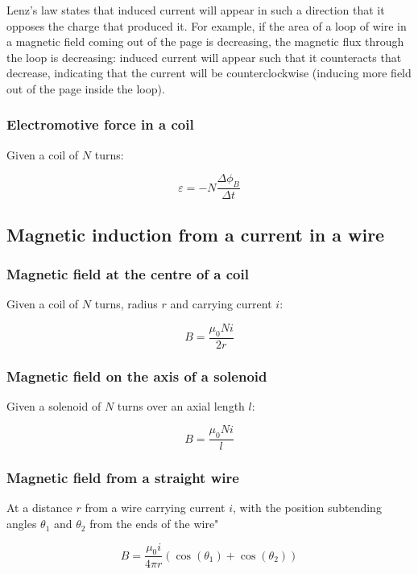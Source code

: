 \documentclass[12pt]{article}
\begin{document}
Lenz's law states that induced current will appear in such a direction that it opposes the charge that produced it.
For example, if the area of a loop of wire in a magnetic field coming out of the page is decreasing, the magnetic flux through the loop is decreasing: induced current will appear such that it counteracts that decrease, indicating that the current will be counterclockwise (inducing more field out of the page inside the loop).

\subsubsection{Electromotive force in a coil}

Given a coil of $N$ turns:

\[
\boxed{
\varepsilon=-N\frac{\Delta \phi_B}{\Delta t}
}
\]

\newpage

\subsection{Magnetic induction from a current in a wire}

\subsubsection{Magnetic field at the centre of a coil}

Given a coil of $N$ turns, radius $r$ and carrying current $i$:

\[
\boxed{
B=\frac{\mu_0 Ni}{2r}
}
\]

\subsubsection{Magnetic field on the axis of a solenoid}

Given a solenoid of $N$ turns over an axial length $l$:

\[
\boxed{
B = \frac{\mu_0 Ni}{l}
}
\]

\subsubsection{Magnetic field from a straight wire}

At a distance $r$ from a wire carrying current $i$, with the position subtending angles $\theta_1$ and $\theta_2$ from the ends of the wire"

\[
\boxed{
B = \frac{\mu_0 i}{4\pi r}\left(\cos(\theta_1) + \cos(\theta_2)\right)
}
\]
\end{document}
